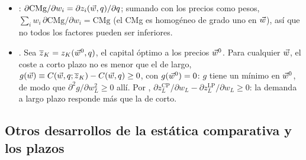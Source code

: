 \documentclass[11pt]{article}
\begin{document}
\begin{itemize}
  \begin{equation*}
  0=\frac{\partial^2C}{\partial q\,\partial w_j}+\frac{\partial^2C}{\partial q^2}\,\frac{\partial q(p,\vect{w})}{\partial w_j}\quad\Longrightarrow\quad\frac{\partial q(p,\vect{w})}{\partial w_j}=-\frac{\partial z_j(\vect{w},q)/\partial q}{\partial^2C/\partial q^2},
  \end{equation*}
  porque $\partial^2C/\partial q\,\partial w_j=\partial z_j(\vect{w},q)/\partial q$ ( y ). Sustituyendo,
  \begin{equation*}
  \frac{\partial z_i(p,\vect{w})}{\partial w_j}=\frac{\partial z_i(\vect{w},q)}{\partial w_j}-\frac{\dfrac{\partial z_i(\vect{w},q)}{\partial q}\,\dfrac{\partial z_j(\vect{w},q)}{\partial q}}{\partial^2C/\partial q^2},
  \end{equation*}
  que es simétrica en $i$ y $j$, como exige . Con $j=i$ y coste marginal creciente, el segundo término es no positivo: refuerza al primero. Del mismo modo, derivando la condición respecto a $p$, $\partial q(p,\vect{w})/\partial p=1/(\partial^2C/\partial q^2)\geq 0$.\findemo
\item {}: $\partial\mathrm{CMg}/\partial w_i=\partial z_i(\vec{w},q)/\partial q$; sumando con los precios como pesos, $\sum_iw_i\,\partial\mathrm{CMg}/\partial w_i=\mathrm{CMg}$ (el CMg es homogéneo de grado uno en $\vec{w}$), así que no todos los factores pueden ser inferiores.
\item {}. Sea $\overline{z}_K=z_K(\vec{w}^0,q)$, el capital óptimo a los precios $\vec{w}^0$. Para cualquier $\vec{w}$, el coste a corto plazo no es menor que el de largo, $g(\vec{w})\equiv C(\vec{w},q;\overline{z}_K)-C(\vec{w},q)\geq 0$, con $g(\vec{w}^0)=0$: $g$ tiene un mínimo en $\vec{w}^0$, de modo que $\partial^2g/\partial w_L^2\geq 0$ allí. Por , $\partial z_L^{\mathrm{CP}}/\partial w_L-\partial z_L^{\mathrm{LP}}/\partial w_L\geq 0$: la demanda a largo plazo responde más que la de corto\nocite{Samuelson1947Foundations}.\findemo
\end{itemize}

\subsection{Otros desarrollos de la estática comparativa y los plazos}\label{anexo:estatica-desarrollo}
\end{document}
